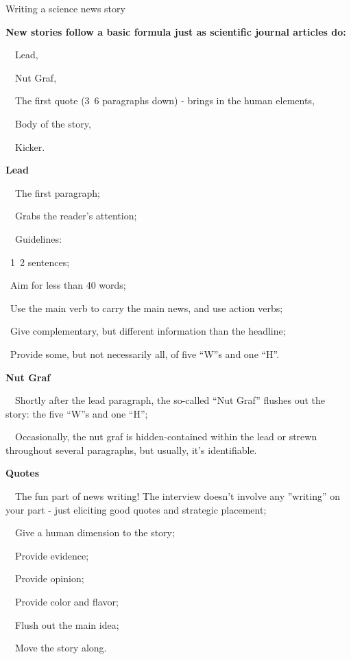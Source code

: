 \documentclass[a4paper, 12pt]{article}
\begin{document}
Writing a science news story

\textbf{New stories follow a basic formula just as scientific journal articles do:}
\par\ \textbullet\ Lead,
\par\ \textbullet\ Nut Graf,
\par\ \textbullet\ The first quote (3~6 paragraphs down) - brings in the human elements,
\par\ \textbullet\ Body of the story,
\par\ \textbullet\ Kicker.

\textbf{Lead}
\par\ \textbullet\ The first paragraph;
\par\ \textbullet\ Grabs the reader's attention;
\par\ \textbullet\ Guidelines:
\par\quad\textopenbullet\ 1~2 sentences;
\par\quad\textopenbullet\ Aim for less than 40 words;
\par\quad\textopenbullet\ Use the main verb to carry the main news, and use action verbs;
\par\quad\textopenbullet\ Give complementary, but different information than the headline;
\par\quad\textopenbullet\ Provide some, but not necessarily all, of five ``W''s and one ``H''.

\textbf{Nut Graf}
\par\ \textbullet\ Shortly after the lead paragraph, the so-called ``Nut Graf'' flushes out the story: the five ``W''s and one ``H'';
\par\ \textbullet\ Occasionally, the nut graf is hidden-contained within the lead or strewn throughout several paragraphs, but usually, it's identifiable.

\newpage\textbf{Quotes}
\par\ \textbullet\ The fun part of news writing! The interview doesn't involve any ''writing'' on your part - just eliciting good quotes and strategic placement;
\par\ \textbullet\ Give a human dimension to the story;
\par\ \textbullet\ Provide evidence;
\par\ \textbullet\ Provide opinion;
\par\ \textbullet\ Provide color and flavor;
\par\ \textbullet\ Flush out the main idea;
\par\ \textbullet\ Move the story along.
\end{document}
